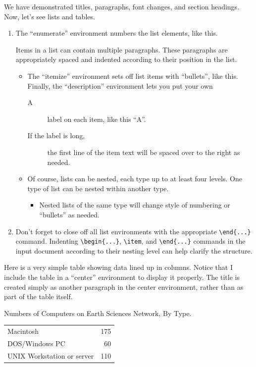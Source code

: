 \documentclass[11pt]{article}
\begin{document}
We have demonstrated titles, paragraphs, font changes, and
section headings.
Now, let's see lists and tables.
\begin{enumerate}
\item 
The ``enumerate'' environment numbers the list elements, like this.

Items in a list can contain multiple paragraphs.
These paragraphs are appropriately spaced and indented according to their
position in the list.
   \begin{itemize}
   \item The ``itemize'' environment sets off list items with ``bullets'',
like this.  Finally, the ``description'' environment lets you put your own
      \begin{description}
      \item[A] label on each item, like this ``A''.
      \item[If the label is long,] the first line of the item text will
be spaced over to the right as needed.
      \end{description}
   \item Of course, lists can be nested, each type up to at least four levels.
One type of list can be nested within another type.
      \begin{itemize}
      \item Nested lists of the same type will change style of numbering 
or ``bullets'' as needed.
      \end{itemize}
   \end{itemize}
\item Don't forget to close off all list environments with the 
appropriate \verb+\end{...}+ command.
Indenting \verb+\begin{...}+, \verb+\item+, and \verb+\end{...}+
commands in the input document according to their nesting level can help 
clarify the structure.
\end{enumerate}

Here is a very simple table showing data lined up in columns.
Notice that I include the table in a ``center'' environment to display
it properly.
The title is created simply as another paragraph in the center environment,
rather than as part of the table itself.
\begin{center}
Numbers of Computers on Earth Sciences Network, By Type.

\begin{tabular}{lr}
Macintosh&175\\
DOS/Windows PC&60\\
UNIX Workstation or server&110\\
\end{tabular}
\end{center}
\end{document}
